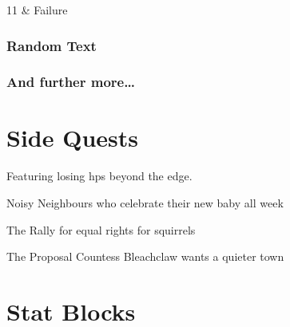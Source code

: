 \documentclass[a4paper,openany]{book}
\begin{document}
\begin{multicols}{2}
\begin{boxtable}
11 & Failure \\

\end{boxtable}

\subsection{Random Text}

\lipsum[7]

\subsection{And further more\ldots}

\lipsum[10]

\begin{boxtext}
  \lipsum[4]
\end{boxtext}

\end{multicols}

\mainmatter

\chapter{Side Quests}


\renewcommand\sqarea{Slums}

Featuring losing \glspl{hp} beyond the \gls{edge}.

\begin{multicols}{2}


\lipsum[2]

{Noisy Neighbours}%
{who celebrate their new baby all week}%

\lipsum[3]

{The Rally}%
{for equal rights for squirrels}%

\lipsum[3]

{The Proposal}%
{Countess Bleachclaw wants a quieter town}%

\lipsum[3]

\stopcontents[sq]

\end{multicols}

\printglossary


\chapter{Stat Blocks}
\end{document}
